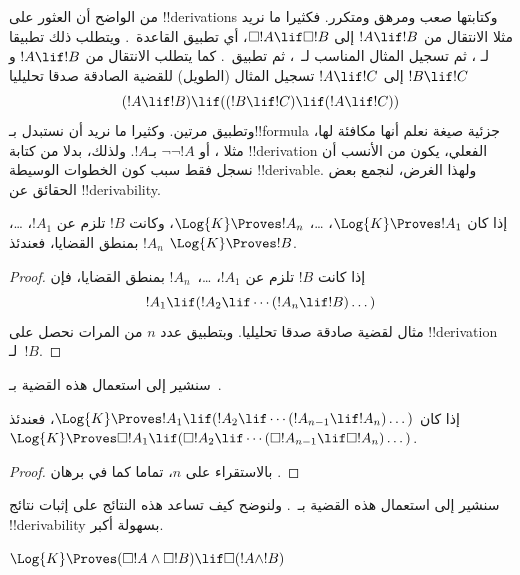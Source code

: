\documentclass[../../../include/open-logic-section]{subfiles}
\begin{document}


من الواضح أن العثور على !!{derivation}s وكتابتها صعب ومرهق ومتكرر.
فكثيرا ما نريد مثلا الانتقال من $!A \lif !B$ إلى
$\Box !A \lif \Box !B$، أي تطبيق القاعدة~\RK. ويتطلب ذلك تطبيقا لـ
\Nec، ثم تسجيل المثال المناسب لـ~، ثم تطبيق~\MP. كما يتطلب
الانتقال من $!A \lif !B$ و$!B \lif !C$ إلى $!A \lif !C$ تسجيل
المثال (الطويل) للقضية الصادقة صدقا تحليليا
\[
(!A \lif !B) \lif ((!B \lif !C) \lif (!A \lif !C))
\]
وتطبيق \MP{} مرتين. وكثيرا ما نريد أن نستبدل بـ!!{formula} جزئية
صيغة نعلم أنها مكافئة لها، مثلا ،
أو $\lnot\lnot !A$ بـ$!A$. ولذلك، بدلا من كتابة !!{derivation}
الفعلي، يكون من الأنسب أن نسجل فقط سبب كون الخطوات الوسيطة
!!{derivable}. ولهذا الغرض، لنجمع بعض الحقائق عن !!{derivability}.

\begin{prop}
  إذا كان $\Log{K} \Proves !A_1$، \dots، $\Log{K} \Proves !A_n$،
  وكانت $!B$ تلزم عن $!A_1$، \dots، $!A_n$ بمنطق القضايا، فعندئذ
  $\Log{K} \Proves !B$.
\end{prop}

\begin{proof}
  إذا كانت $!B$ تلزم عن $!A_1$، \dots،~$!A_n$ بمنطق القضايا، فإن
  \[
  !A_1 \lif (!A_2 \lif \cdots (!A_n \lif !B)\dots)
  \]
  مثال لقضية صادقة صدقا تحليليا. وبتطبيق \MP{} عدد $n$ من المرات
  نحصل على !!{derivation} لـ~$!B$.
\end{proof}

سنشير إلى استعمال هذه القضية بـ~\PL.

\begin{prop}
  إذا كان $\Log{K} \Proves !A_1 \lif (!A_2 \lif \cdots (!A_{n-1} \lif
  !A_n)\dots)$، فعندئذ $\Log{K} \Proves \Box !A_1 \lif (\Box !A_2 \lif
  \cdots (\Box !A_{n-1} \lif \Box !A_n)\dots)$.
\end{prop}

\begin{proof}
  بالاستقراء على $n$، تماما كما في برهان .
\end{proof}

سنشير إلى استعمال هذه القضية بـ~\RK. ولنوضح كيف تساعد هذه النتائج
على إثبات نتائج !!{derivability} بسهولة أكبر.

\begin{prop}
  $\Log{K} \Proves (\Box!A \land \Box!B) \lif \Box (!A \land !B)$
\end{prop}
\end{document}
